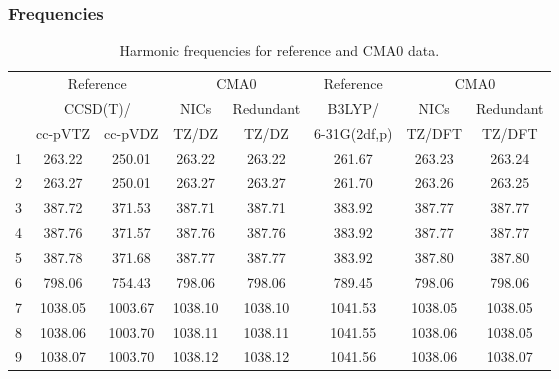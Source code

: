 \documentclass[10pt,oneside]{article}
\begin{document}
\begin{table}[h!]
\subsubsection*{Frequencies}
\centering
\caption{Harmonic frequencies for reference and CMA0 data.}
\begin{tabular}{cccccccc}
\toprule
{} & \multicolumn{2}{c}{Reference} & \multicolumn{2}{c}{CMA0} &    Reference & \multicolumn{2}{c}{CMA0} \\
{} & \multicolumn{2}{c}{CCSD(T)/} &    NICs &  Redundant &       B3LYP/ &    NICs & Redundant \\
{} &   cc-pVTZ & cc-pVDZ &   TZ/DZ &      TZ/DZ & 6-31G(2df,p) &  TZ/DFT &    TZ/DFT \\
\midrule
1 &    263.22 &  250.01 &  263.22 &     263.22 &       261.67 &  263.23 &    263.24 \\
2 &    263.27 &  250.01 &  263.27 &     263.27 &       261.70 &  263.26 &    263.25 \\
3 &    387.72 &  371.53 &  387.71 &     387.71 &       383.92 &  387.77 &    387.77 \\
4 &    387.76 &  371.57 &  387.76 &     387.76 &       383.92 &  387.77 &    387.77 \\
5 &    387.78 &  371.68 &  387.77 &     387.77 &       383.92 &  387.80 &    387.80 \\
6 &    798.06 &  754.43 &  798.06 &     798.06 &       789.45 &  798.06 &    798.06 \\
7 &   1038.05 & 1003.67 & 1038.10 &    1038.10 &      1041.53 & 1038.05 &   1038.05 \\
8 &   1038.06 & 1003.70 & 1038.11 &    1038.11 &      1041.55 & 1038.06 &   1038.05 \\
9 &   1038.07 & 1003.70 & 1038.12 &    1038.12 &      1041.56 & 1038.06 &   1038.07 \\
\bottomrule
\end{tabular}
\end{table}
\end{document}
